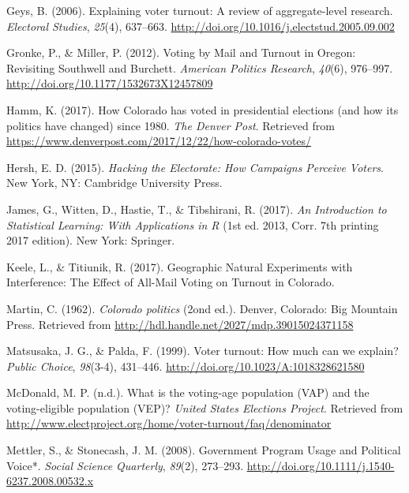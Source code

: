 \documentclass[12pt,twoside]{reedthesis}
\begin{document}
  \hypertarget{ref-geys_explaining_2006}{}
  Geys, B. (2006). Explaining voter turnout: A review of aggregate-level
  research. \emph{Electoral Studies}, \emph{25}(4), 637--663.
  \url{http://doi.org/10.1016/j.electstud.2005.09.002}
  
  \hypertarget{ref-gronke_voting_2012}{}
  Gronke, P., \& Miller, P. (2012). Voting by Mail and Turnout in Oregon:
  Revisiting Southwell and Burchett. \emph{American Politics Research},
  \emph{40}(6), 976--997. \url{http://doi.org/10.1177/1532673X12457809}
  
  \hypertarget{ref-hamm_how_2017}{}
  Hamm, K. (2017). How Colorado has voted in presidential elections (and
  how its politics have changed) since 1980. \emph{The Denver Post}.
  Retrieved from
  \url{https://www.denverpost.com/2017/12/22/how-colorado-votes/}
  
  \hypertarget{ref-hersh_hacking_2015}{}
  Hersh, E. D. (2015). \emph{Hacking the Electorate: How Campaigns
  Perceive Voters}. New York, NY: Cambridge University Press.
  
  \hypertarget{ref-james_introduction_2017}{}
  James, G., Witten, D., Hastie, T., \& Tibshirani, R. (2017). \emph{An
  Introduction to Statistical Learning: With Applications in R} (1st ed.
  2013, Corr. 7th printing 2017 edition). New York: Springer.
  
  \hypertarget{ref-keele_geographic_2017}{}
  Keele, L., \& Titiunik, R. (2017). Geographic Natural Experiments with
  Interference: The Effect of All-Mail Voting on Turnout in Colorado.
  
  \hypertarget{ref-martin_colorado_1962}{}
  Martin, C. (1962). \emph{Colorado politics} (2ond ed.). Denver,
  Colorado: Big Mountain Press. Retrieved from
  \url{http://hdl.handle.net/2027/mdp.39015024371158}
  
  \hypertarget{ref-matsusaka_voter_1999}{}
  Matsusaka, J. G., \& Palda, F. (1999). Voter turnout: How much can we
  explain? \emph{Public Choice}, \emph{98}(3-4), 431--446.
  \url{http://doi.org/10.1023/A:1018328621580}
  
  \hypertarget{ref-mcdonald_what_nodate}{}
  McDonald, M. P. (n.d.). What is the voting-age population (VAP) and the
  voting-eligible population (VEP)? \emph{United States Elections
  Project}. Retrieved from
  \url{http://www.electproject.org/home/voter-turnout/faq/denominator}
  
  \hypertarget{ref-mettler_government_2008}{}
  Mettler, S., \& Stonecash, J. M. (2008). Government Program Usage and
  Political Voice*. \emph{Social Science Quarterly}, \emph{89}(2),
  273--293. \url{http://doi.org/10.1111/j.1540-6237.2008.00532.x}
  
\end{document}
